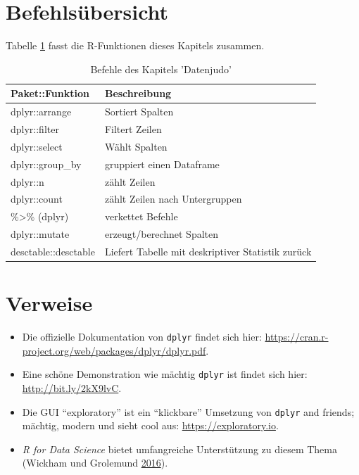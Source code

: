 \documentclass[12pt,ngerman,]{book}
\theoremstyle{definition}
\theoremstyle{definition}
\theoremstyle{remark}
\begin{document}
\section{Befehlsübersicht}\label{befehlsubersicht-2}

Tabelle \ref{tab:befehle-datenjudo} fasst die R-Funktionen dieses
Kapitels zusammen.

\begin{table}

\caption{\label{tab:befehle-datenjudo}Befehle des Kapitels 'Datenjudo'}
\centering
\begin{tabular}[t]{l|l}
\hline
Paket::Funktion & Beschreibung\\
\hline
dplyr::arrange & Sortiert Spalten\\
\hline
dplyr::filter & Filtert Zeilen\\
\hline
dplyr::select & Wählt Spalten\\
\hline
dplyr::group\_by & gruppiert einen Dataframe\\
\hline
dplyr::n & zählt Zeilen\\
\hline
dplyr::count & zählt Zeilen nach Untergruppen\\
\hline
\%>\% (dplyr) & verkettet Befehle\\
\hline
dplyr::mutate & erzeugt/berechnet Spalten\\
\hline
desctable::desctable & Liefert Tabelle mit deskriptiver Statistik zurück\\
\hline
\end{tabular}
\end{table}

\section{Verweise}\label{verweise-2}

\begin{itemize}
\item
  Die offizielle Dokumentation von \texttt{dplyr} findet sich hier:
  \url{https://cran.r-project.org/web/packages/dplyr/dplyr.pdf}.
\item
  Eine schöne Demonstration wie mächtig \texttt{dplyr} ist findet sich
  hier: \url{http://bit.ly/2kX9lvC}.
\item
  Die GUI ``exploratory'' ist ein ``klickbare'' Umsetzung von
  \texttt{dplyr} and friends; mächtig, modern und sieht cool aus:
  \url{https://exploratory.io}.
\item
  \emph{R for Data Science} bietet umfangreiche Unterstützung zu diesem
  Thema (Wickham und Grolemund \protect\hyperlink{ref-r4ds}{2016}).
\end{itemize}
\end{document}
